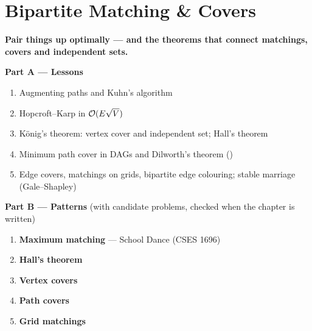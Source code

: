 \chapter{Bipartite Matching \& Covers}
\label{ch:bipartite_matching}

\begin{tcolorbox}[enhanced, colback=white, colframe=secondaryblue, boxrule=1pt, arc=2mm]
\textbf{\large\textcolor{primaryblue}{Pair things up optimally --- and the theorems that connect matchings, covers and independent sets.}}
\end{tcolorbox}


\begin{plannedbox}
\textbf{Part A --- Lessons}
\begin{enumerate}[leftmargin=*, label=\textbf{A\arabic*.}, itemsep=1pt]
    \item Augmenting paths and Kuhn's algorithm
    \item Hopcroft--Karp in $\mathcal{O}(E\sqrt{V})$
    \item K\"onig's theorem: vertex cover and independent set; Hall's theorem
    \item Minimum path cover in DAGs and Dilworth's theorem ()
    \item Edge covers, matchings on grids, bipartite edge colouring; stable marriage (Gale--Shapley)
\end{enumerate}
\textbf{Part B --- Patterns} (with candidate problems, checked when the chapter is written)
\begin{enumerate}[leftmargin=*, label=\textbf{P\arabic*.}, itemsep=1pt]
    \item \textbf{Maximum matching} --- School Dance {\small\color{darkgray}(CSES 1696)}
    \item \textbf{Hall's theorem}
    \item \textbf{Vertex covers}
    \item \textbf{Path covers}
    \item \textbf{Grid matchings}
\end{enumerate}
\end{plannedbox}
